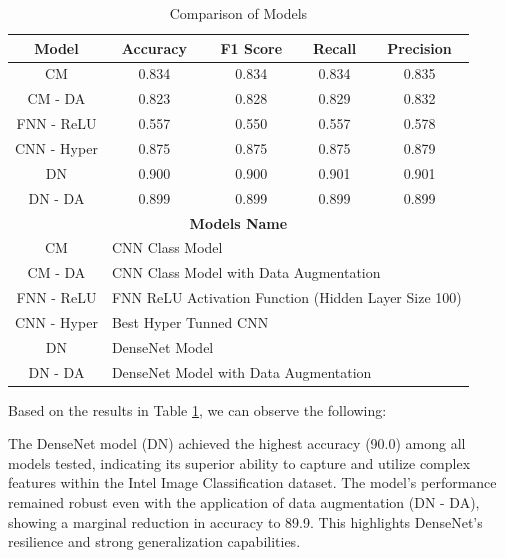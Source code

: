 \begin{table}[ht]
    \centering
    \caption{Comparison of Models} 
    \begin{tabular}{||c|c|c|c|c||} 
     \hline    
     \textbf{Model} & \textbf{Accuracy} & \textbf{F1 Score} & \textbf{Recall} & \textbf{Precision} \\
     \hline \hline
     CM & 0.834 & 0.834 & 0.834 & 0.835 \\
     \hline
     CM - DA & 0.823 & 0.828 & 0.829 & 0.832 \\
     \hline
          FNN - ReLU & 0.557 & 0.550 & 0.557 & 0.578 \\
     \hline
    CNN - Hyper & 0.875 & 0.875 & 0.875 & 0.879 \\
    \hline
     DN & 0.900 & 0.900 & 0.901 & 0.901 \\
     \hline 
     DN - DA & 0.899 & 0.899 & 0.899 & 0.899 \\
     \hline
\hline
     \multicolumn{5}{||c||}{\textbf{Models Name}} \\
     \hline
     CM & \multicolumn{4}{|l||}{CNN Class Model} \\ 
     \hline
     CM - DA & \multicolumn{4}{|l||}{CNN Class Model with Data Augmentation} \\ 
     \hline
          FNN - ReLU & \multicolumn{4}{|l||}{FNN ReLU Activation Function (Hidden Layer Size 100)} \\ 
     \hline
         CNN - Hyper & \multicolumn{4}{|l||}{Best Hyper Tunned CNN} \\ 
    \hline
     DN & \multicolumn{4}{|l||}{DenseNet Model} \\ 
     \hline
     DN - DA & \multicolumn{4}{|l||}{DenseNet Model with Data Augmentation} \\ 
     \hline

    \end{tabular}
    \label{tab:tab_Final_results}
\end{table}


Based on the results in Table \ref{tab:tab_Final_results}, we can observe the following:

The DenseNet model (DN) achieved the highest accuracy (90.0) among all models tested, indicating its superior ability to capture and utilize complex features within the Intel Image Classification dataset. The model's performance remained robust even with the application of data augmentation (DN - DA), showing a marginal reduction in accuracy to 89.9. This highlights DenseNet's resilience and strong generalization capabilities.

